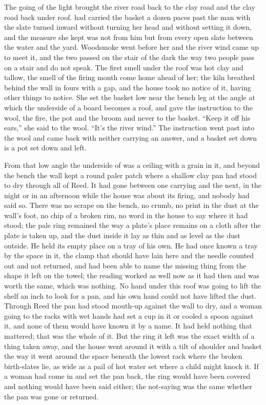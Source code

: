 The going of the light brought the river road back to the clay road and the clay road back under  roof.  had carried the basket a dozen paces past the man with the slate turned inward without turning her head and without setting it down, and the measure she kept was not from him but from every open slate between the water and the yard. Woodsmoke went before her and the river wind came up to meet it, and the two passed on the stair of the dark the way two people pass on a stair and do not speak. The first smell under the roof was hot clay and tallow, the smell of the firing month come home ahead of her; the kiln breathed behind the wall in fours with a gap, and the house took no notice of it, having other things to notice. She set the basket low near the bench leg at the angle at which the underside of a board becomes a roof, and gave the instruction to the wool, the fire, the pot and the broom and never to the basket. “Keep it off his ears,” she said to the wool. “It's the river wind.” The instruction went past  into the wool and came back with neither carrying an answer, and a basket set down is a pot set down and left.

From that low angle the underside of  was a ceiling with a grain in it, and beyond the bench the wall kept a round paler patch where a shallow clay pan had stood to dry through all of Reed. It had gone between one carrying and the next, in the night or in an afternoon while the house was about its firing, and nobody had said so. There was no scrape on the bench, no crumb, no print in the dust at the wall's foot, no chip of a broken rim, no word in the house to say where it had stood; the pale ring remained the way a plate's place remains on a cloth after the plate is taken up, and the dust inside it lay as thin and as level as the dust outside. He held its empty place on a tray of his own. He had once known a tray by the space in it, the clamp that should have lain here and the needle counted out and not returned, and had been able to name the missing thing from the shape it left on the towel; the reading worked as well now as it had then and was worth the same, which was nothing. No hand under this roof was going to lift the shelf an inch to look for a pan, and his own hand could not have lifted the dust. Through Reed the pan had stood mouth-up against the wall to dry, and a woman going to the racks with wet hands had set a cup in it or cooled a spoon against it, and none of them would have known it by a name. It had held nothing that mattered; that was the whole of it. But the ring it left was the exact width of a thing taken away, and the house went around it with a tilt of shoulder and basket the way it went around the space beneath the lowest rack where the broken birth-slates lie, as wide as a pail of hot water set where a child might knock it. If a woman had come in and set the pan back, the ring would have been covered and nothing would have been said either; the not-saying was the same whether the pan was gone or returned.

